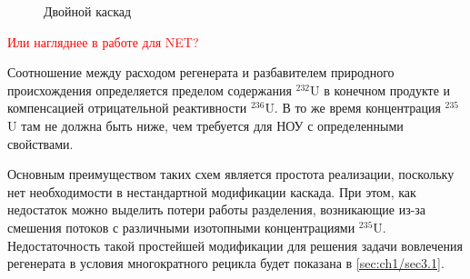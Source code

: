 \begin{figure}[ht]
  \caption{Двойной каскад}\label{fig:diagram1}
\end{figure}

\textcolor{red}{Или нагляднее в работе для NET?}

Соотношение между расходом регенерата и разбавителем природного происхождения определяется пределом содержания $^{232}$U в конечном продукте и компенсацией отрицательной реактивности $^{236}$U. В то же время концентрация $^{235}$U там не должна быть ниже, чем требуется для НОУ с определенными свойствами.

Основным преимуществом таких схем является простота реализации, поскольку нет необходимости в нестандартной модификации каскада. При этом, как недостаток можно выделить потери работы разделения, возникающие из-за смешения потоков с различными изотопными концентрациями $^{235}$U. 
Недостаточность такой простейшей модификации для решения задачи вовлечения регенерата в условия многократного рецикла будет показана в \ref{sec:ch1/sec3.1}.

